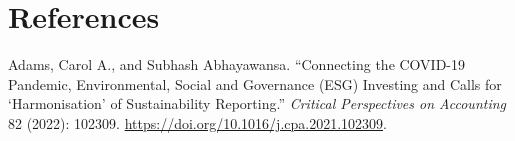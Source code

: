 {}
\section*{References}
\begingroup
\setlength{\parindent}{0pt}\setlength{\parskip}{6pt}\small
{}

Adams, Carol A., and Subhash Abhayawansa. ``Connecting the COVID-19 Pandemic, Environmental, Social and Governance (ESG) Investing and Calls for `Harmonisation' of Sustainability Reporting.'' \emph{Critical Perspectives on Accounting} 82 (2022): 102309. \url{https://doi.org/10.1016/j.cpa.2021.102309}. %

